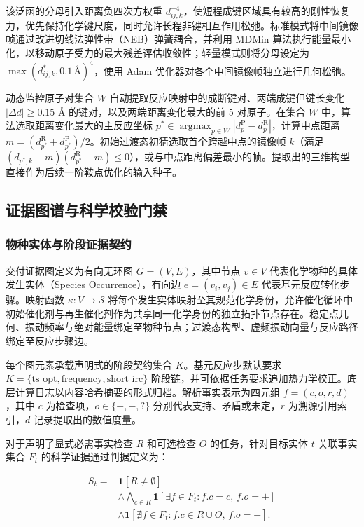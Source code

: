 该泛函的分母引入距离负四次方权重 $d_{ij,k}^{-4}$，使短程成键区域具有较高的刚性恢复力，优先保持化学键尺度，同时允许长程非键相互作用松弛。标准模式将中间镜像帧通过改进切线法弹性带（NEB）弹簧耦合，并利用 MDMin 算法执行能量最小化，以移动原子受力的最大残差评估收敛性；轻量模式则将分母设定为 $\max(d_{ij,k}^*,0.1\,\text{Å})^4$，使用 Adam 优化器对各个中间镜像帧独立进行几何松弛。

动态监控原子对集合 $W$ 自动提取反应映射中的成断键对、两端成键但键长变化 $|\Delta d|\ge 0.15$ Å 的键对，以及两端距离变化最大的前 5 对原子。在集合 $W$ 中，算法选取距离变化最大的主反应坐标 $p^*\in\operatorname{argmax}_{p\in W}|d_p^{\mathrm{P}}-d_p^{\mathrm{R}}|$，计算中点距离 $m=(d_{p^*}^{\mathrm{R}}+d_{p^*}^{\mathrm{P}})/2$。初始过渡态初猜选取首个跨越中点的镜像帧 $k$（满足 $(d_{p^*,k}-m)(d_{p^*}^{\mathrm{R}}-m)\le 0$），或与中点距离偏差最小的帧。提取出的三维构型直接作为后续一阶鞍点优化的输入种子。

\subsection{证据图谱与科学校验门禁}

\subsubsection{物种实体与阶段证据契约}
交付证据图定义为有向无环图 $G=(V,E)$，其中节点 $v\in V$ 代表化学物种的具体发生实体（Species Occurrence），有向边 $e=(v_i,v_j)\in E$ 代表基元反应转化步骤。映射函数 $\kappa:V\to\mathcal{S}$ 将每个发生实体映射至其规范化学身份，允许催化循环中初始催化剂与再生催化剂作为共享同一化学身份的独立拓扑节点存在。稳定点几何、振动频率与绝对能量绑定至物种节点；过渡态构型、虚频振动向量与反应路径绑定至反应步骤边。

每个图元素承载声明式的阶段契约集合 $K$。基元反应步默认要求 $K=\{\text{ts\_opt}, \text{frequency}, \text{short\_irc}\}$ 阶段链，并可依据任务要求追加热力学校正。底层计算日志以内容哈希摘要的形式归档。解析事实表示为四元组 $f=(c,o,r,d)$，其中 $c$ 为检查项，$o\in\{+,-,?\}$ 分别代表支持、矛盾或未定，$r$ 为溯源引用索引，$d$ 记录提取出的数值度量。

对于声明了显式必需事实检查 $R$ 和可选检查 $O$ 的任务，针对目标实体 $t$ 关联事实集合 $F_t$ 的科学证据通过判据定义为：

\begin{equation}\label{eq:methods-09}
\begin{aligned}
S_t={}&\mathbf{1}[R\ne\emptyset]\\
&\wedge\bigwedge_{c\in R}\mathbf{1}[\exists f\in F_t:f.c=c,\,f.o=+]\\
&\wedge\mathbf{1}[\nexists f\in F_t:f.c\in R\cup O,\,f.o=-].
\end{aligned}
\end{equation}

